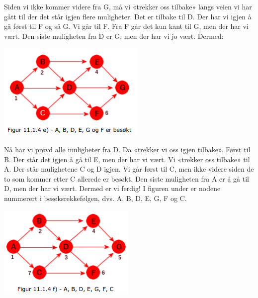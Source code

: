 \documentclass[11pt]{article}
\begin{document}
            \begin{multicols}{2}
                Siden vi ikke kommer videre fra G, må vi «trekker oss tilbake» langs veien vi har gått til der
                det står igjen flere muligheter. Det er tilbake til D. Der har vi igjen å gå først til F og så G. Vi
                går til F. Fra F går det kun kant til G, men der har vi vært. Den siste muligheten fra D er G,
                men der har vi jo vært. Dermed: 

                \columnbreak

                \includegraphics[center]{f-11.1.4e.png}
                
            \end{multicols}
            \begin{multicols}{2}
                Nå har vi prøvd alle muligheter fra D. Da «trekker vi oss igjen tilbake». Først til B. Der står
                det igjen å gå til E, men der har vi vært. Vi «trekker oss tilbake» til A. Der står mulighetene C
                og D igjen. Vi går først til C, men ikke videre siden de to som kommer etter C allerede er
                besøkt. Den siste muligheten fra A er å gå til D, men der har vi vært. Dermed er vi ferdig! I
                figuren under er nodene nummerert i besøksrekkefølgen, dvs. A, B, D, E, G, F og C. 

                \columnbreak

                \includegraphics[center]{f-11.1.4f.png}
                
            \end{multicols}
\end{document}
